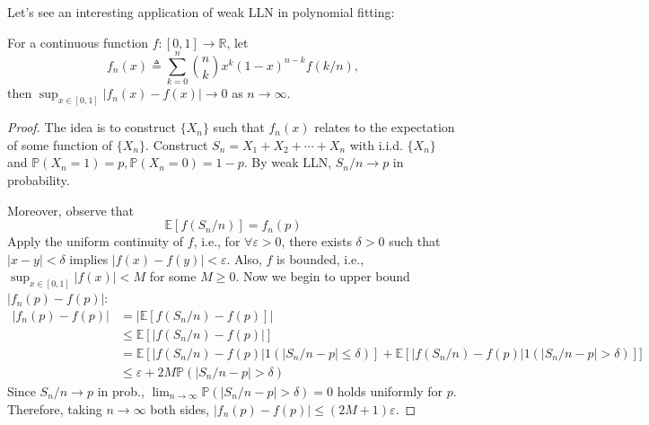 Let's see an interesting application of weak LLN in polynomial fitting:
\begin{proposition}
For a continuous function $f:[0,1]\to\mathbb{R}$, let
\[
f_n(x)\triangleq \sum_{k=0}^n\binom{n}{k}x^k(1-x)^{n-k}f(k/n),
\]
then $\sup_{x\in[0,1]}|f_n(x) - f(x)|\to0$ as $n\to\infty$.
\end{proposition}
\begin{proof}
The idea is to construct $\{X_n\}$ such that $f_n(x)$ relates to the expectation of some function of $\{X_n\}$.
Construct $S_n = X_1+X_2+\cdots+X_n$ with i.i.d. $\{X_n\}$ and $\mathbb{P}(X_n=1)=p, \mathbb{P}(X_n=0)=1-p$.
By weak LLN, $S_n/n\to p$ in probability.

Moreover, observe that 
\[
\mathbb{E}[f(S_n/n)] = f_n(p)
\]
Apply the uniform continuity of $f$, i.e., for $\forall\varepsilon>0$, there exists $\delta>0$ such that $|x-y|<\delta$ implies $|f(x)-f(y)|<\varepsilon$. Also, $f$ is bounded, i.e., $\sup_{x\in[0,1]}|f(x)|<M$ for some $M\ge0$.
Now we begin to upper bound $|f_n(p) - f(p)|$:
\begin{align*}
|f_n(p) - f(p)| &= \left|
\mathbb{E}[f(S_n/n) - f(p)]
\right|\\
&\le
\mathbb{E}[
|f(S_n/n) - f(p)|]\\
&=
\mathbb{E}[|f(S_n/n) - f(p)| 1(|S_n/n-p|\le\delta)] + \mathbb{E}[|f(S_n/n) - f(p)| 1(|S_n/n-p|>\delta)]
]\\
&\le\varepsilon + 2M\mathbb{P}(|S_n/n-p|>\delta)
\end{align*}
Since $S_n/n\to p$ in prob., $\lim_{n\to\infty}\mathbb{P}(|S_n/n-p|>\delta)=0$ holds uniformly for $p$.
Therefore, taking $n\to\infty$ both sides, $|f_n(p) - f(p)|\le (2M+1)\varepsilon$.


\end{proof}

